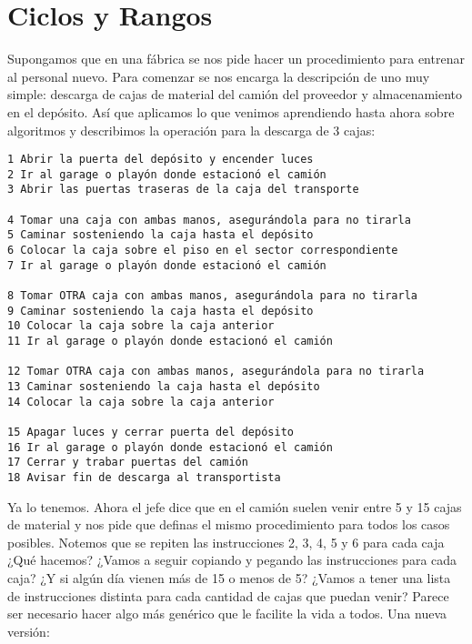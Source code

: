 \documentclass[
  letterpaper,
  DIV=11,
  numbers=noendperiod]{scrreprt}
\begin{document}
\section{Ciclos y Rangos}\label{ciclos-y-rangos}

Supongamos que en una fábrica se nos pide hacer un procedimiento para
entrenar al personal nuevo. Para comenzar se nos encarga la descripción
de uno muy simple: descarga de cajas de material del camión del
proveedor y almacenamiento en el depósito. Así que aplicamos lo que
venimos aprendiendo hasta ahora sobre algoritmos y describimos la
operación para la descarga de 3 cajas:

\begin{verbatim}
1 Abrir la puerta del depósito y encender luces 
2 Ir al garage o playón donde estacionó el camión 
3 Abrir las puertas traseras de la caja del transporte

4 Tomar una caja con ambas manos, asegurándola para no tirarla 
5 Caminar sosteniendo la caja hasta el depósito 
6 Colocar la caja sobre el piso en el sector correspondiente 
7 Ir al garage o playón donde estacionó el camión

8 Tomar OTRA caja con ambas manos, asegurándola para no tirarla 
9 Caminar sosteniendo la caja hasta el depósito 
10 Colocar la caja sobre la caja anterior 
11 Ir al garage o playón donde estacionó el camión

12 Tomar OTRA caja con ambas manos, asegurándola para no tirarla 
13 Caminar sosteniendo la caja hasta el depósito 
14 Colocar la caja sobre la caja anterior

15 Apagar luces y cerrar puerta del depósito 
16 Ir al garage o playón donde estacionó el camión 
17 Cerrar y trabar puertas del camión 
18 Avisar fin de descarga al transportista
\end{verbatim}

Ya lo tenemos. Ahora el jefe dice que en el camión suelen venir entre 5
y 15 cajas de material y nos pide que definas el mismo procedimiento
para todos los casos posibles. Notemos que se repiten las instrucciones
2, 3, 4, 5 y 6 para cada caja ¿Qué hacemos? ¿Vamos a seguir copiando y
pegando las instrucciones para cada caja? ¿Y si algún día vienen más de
15 o menos de 5? ¿Vamos a tener una lista de instrucciones distinta para
cada cantidad de cajas que puedan venir? Parece ser necesario hacer algo
más genérico que le facilite la vida a todos. Una nueva versión:
\end{document}
